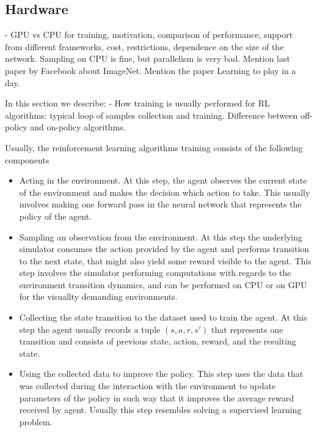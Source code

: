 \subsection{Hardware}


- GPU vs CPU for training, motivation, comparison of performance, support
  from different frameworks, cost, restrictions, dependence on the size of
  the network. Sampling on CPU is fine, but parallelism is very bad.
  Mention last paper by Facebook about ImageNet. Mention the paper Learning
  to play in a day.

In this section we describe:
- How training is usually performed for RL algorithms: typical loop of samples collection
and training. Difference between off-policy and on-policy algorithms.

Usually, the reinforcement learning algorithms training consists of the following components

\begin{itemize}
    \item Acting in the environment. At this step, the agent observes the current state of the
    environment and makes the decision which action to take. This usually involves making one
    forward pass in the neural network that represents the policy of the agent.

    \item Sampling an observation from the environment. At this step the underlying simulator consumes
    the action provided by the agent and performs transition to the next state, that might also
    yield some reward visible to the agent. This step involves the simulator performing computations
    with regards to the environment transition dynamics, and can be performed on CPU or on GPU for
    the visuallty demanding environments.

    \item Collecting the state transition to the dataset used to train the agent. At this step
    the agent usually records a tuple $(s, a, r, s')$ that represents one transition and
    consists of previous state, action, reward, and the resulting state.

    \item Using the collected data to improve the policy. This step uses the data that was collected
    during the interaction with the environment to update parameters of the policy in such way that
    it improves the average reward received by agent. Usually this step resembles solving a
    supervised learning problem.
\end{itemize}


